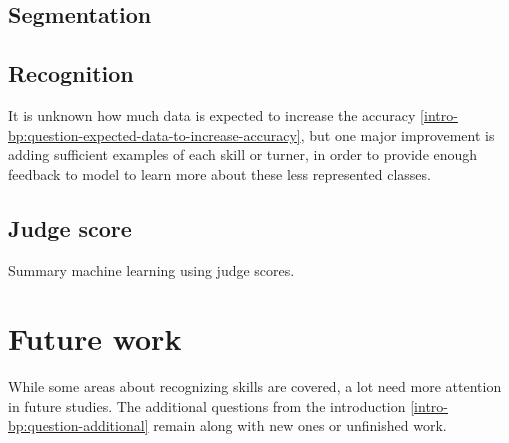 \subsection{Segmentation}

\subsection{Recognition}

It is unknown how much data is expected to increase the accuracy \ref{intro-bp:question-expected-data-to-increase-accuracy}, but one major improvement is adding sufficient examples of each skill or turner, in order to provide enough feedback to model to learn more about these less represented classes.

\subsection{Judge score}


Summary machine learning using judge scores.

\section{Future work}

While some areas about recognizing skills are covered, a lot need more attention in future studies. The additional questions from the introduction \ref{intro-bp:question-additional} remain along with new ones or unfinished work.

